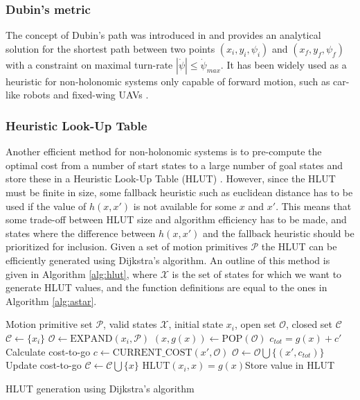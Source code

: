 \subsubsection{Dubin's metric}
The concept of Dubin's path was introduced in \cite{dubins} and provides an analytical solution for the
shortest path between two points $(x_i,y_i,\psi_i)$ and $(x_f,y_f,\psi_f)$ with a constraint on maximal turn-rate $|\dot{\psi}|\leq\dot{\psi}_{max}$.
It has been widely used as a heuristic for non-holonomic systems only capable of forward motion, such as car-like robots and fixed-wing UAVs \cite{2_phase_uav}.
\subsubsection{Heuristic Look-Up Table}\label{sec:hlut}
Another efficient method for non-holonomic systems is to pre-compute the optimal cost from a number of start states to 
a large number of goal states and store these in a Heuristic Look-Up Table (HLUT) \cite{hlut}. However, since the HLUT 
must be finite in size, some fallback heuristic such as euclidean distance has to be used if the value of $h(x,x')$ is not available for some $x$ and $x'$.
This means that some trade-off between HLUT size and algorithm efficiency has to be made, and states where the difference between $h(x,x')$ and the fallback heuristic 
should be prioritized for inclusion. Given a set of motion primitives $\mathcal{P}$ the HLUT can be efficiently generated using Dijkstra's algorithm. 
An outline of this method is given in Algorithm \ref{alg:hlut}, where $\mathcal{X}$ is the set of states for which we want to generate HLUT values, and the function definitions 
are equal to the ones in Algorithm \ref{alg:astar}.

\begin{algorithm}
    \begin{algorithmic}
        \Require Motion primitive set $\mathcal{P}$, valid states $\mathcal{X}$, initial state $x_i$, open set $\mathcal{O}$, closed set $\mathcal{C}$
            \State $\mathcal{C}\gets \{x_i\}$
            \State $\mathcal{O}\gets\text{EXPAND}(x_i, \mathcal{P})$
                \State $(x,g(x))\gets \text{POP}(\mathcal{O})$
                        \State $c_{tot}=g(x) + c'$ \Comment Calculate cost-to-go
                        \State $c\gets\text{CURRENT\_COST}(x', \mathcal{O})$
                            \State $\mathcal{O}\gets\mathcal{O}\bigcup\{(x',c_{tot})\}$\Comment Update cost-to-go
                        \EndIf
                    \EndIf
                \EndFor
            \State $\mathcal{C}\gets\mathcal{C}\bigcup \{x\}$
            \State $\text{HLUT}(x_i,x)=g(x)$\Comment Store value in HLUT
            \EndWhile
        \end{algorithmic}
        \caption{HLUT generation using Dijkstra's algorithm}
        \label{alg:hlut}
\end{algorithm}